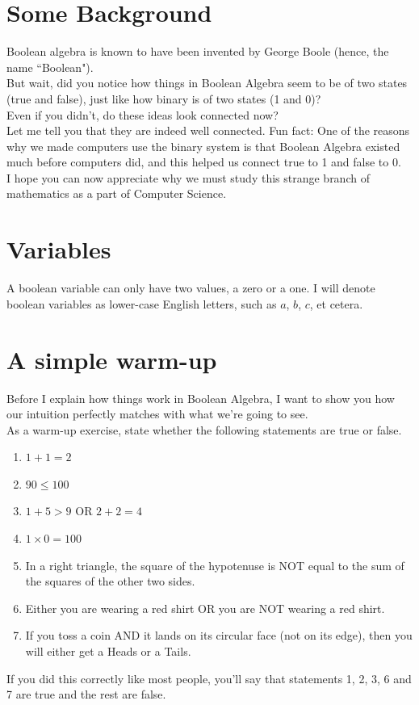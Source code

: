 \documentclass[letterpaper, 12pt]{book}
\begin{document}
\section{Some Background}
Boolean algebra is known to have been invented by George Boole (hence, the name ``Boolean").\\
But wait, did you notice how things in Boolean Algebra seem to be of two states (true and false), just like how binary is of two states (1 and 0)?\\
Even if you didn't, do these ideas look connected now?\\
Let me tell you that they are indeed well connected. Fun fact: One of the reasons why we made computers use the binary system is that Boolean Algebra existed much before computers did, and this helped us connect true to 1 and false to 0.\\
I hope you can now appreciate why we must study this strange branch of mathematics as a part of Computer Science.
\section{Variables}
A boolean variable can only have two values, a zero or a one. I will denote boolean variables as lower-case English letters, such as $a$, $b$, $c$, et cetera.
\section{A simple warm-up}
Before I explain how things work in Boolean Algebra, I want to show you how our intuition perfectly matches with what we're going to see.\\
As a warm-up exercise, state whether the following statements are true or false.\\
\begin{enumerate}
	\item $1 + 1 = 2$
	\item $90 \le 100$
	\item $1 + 5 > 9$ OR $2 + 2 = 4$
	\item $1 \times 0 = 100$
	\item In a right triangle, the square of the hypotenuse is NOT equal to the sum of the squares of the other two sides.
	\item Either you are wearing a red shirt OR you are NOT wearing a red shirt.
	\item If you toss a coin AND it lands on its circular face (not on its edge), then you will either get a Heads or a Tails.
\end{enumerate}
If you did this correctly like most people, you'll say that statements 1, 2, 3, 6 and 7 are true and the rest are false.
\end{document}
